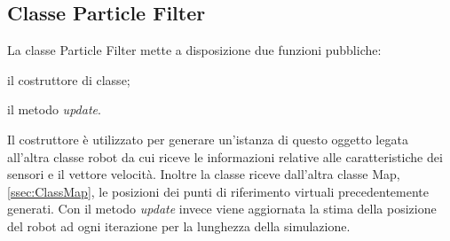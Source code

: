 \subsection{Classe Particle Filter}
\label{ssec:ClassPF}
La classe Particle Filter mette a disposizione due funzioni pubbliche:
\begin{enumerate*}[label={\alph*)},font={\bfseries}]
	\item il costruttore di classe;
	\item il metodo \emph{update}.
\end{enumerate*}
Il costruttore è utilizzato per generare
un'istanza di questo oggetto legata all'altra classe robot da cui riceve le
informazioni relative alle caratteristiche dei sensori e il vettore velocità.
Inoltre la classe riceve dall'altra classe Map, \ref{ssec:ClassMap}, le
posizioni dei punti di riferimento virtuali precedentemente generati.
Con il metodo \emph{update} invece viene aggiornata la stima della posizione del
robot ad ogni iterazione per la lunghezza della simulazione.
